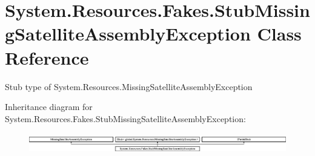 \hypertarget{class_system_1_1_resources_1_1_fakes_1_1_stub_missing_satellite_assembly_exception}{\section{System.\-Resources.\-Fakes.\-Stub\-Missing\-Satellite\-Assembly\-Exception Class Reference}
\label{class_system_1_1_resources_1_1_fakes_1_1_stub_missing_satellite_assembly_exception}
}


Stub type of System.\-Resources.\-Missing\-Satellite\-Assembly\-Exception 


Inheritance diagram for System.\-Resources.\-Fakes.\-Stub\-Missing\-Satellite\-Assembly\-Exception\-:\begin{figure}[H]
\begin{center}
\leavevmode
\includegraphics[height=0.901771cm]{class_system_1_1_resources_1_1_fakes_1_1_stub_missing_satellite_assembly_exception}
\end{center}
\end{figure}
